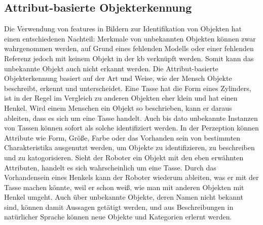 \subsection{Attribut-basierte Objekterkennung}
\label{sec:aboi}

Die Verwendung von \glspl{feature} in Bildern zur Identifikation von Objekten hat einen entschiedenen Nachteil: Merkmale von unbekannten Objekten können zwar wahrgenommen werden, auf Grund eines fehlenden Modells oder einer fehlenden Referenz jedoch mit keinem Objekt in der \gls{kb} verknüpft werden. Somit kann das unbekannte Objekt auch nicht erkannt werden. \newline
Die Attribut-basierte Objekterkennung basiert auf der Art und Weise, wie der Mensch Objekte beschreibt, erkennt und unterscheidet. Eine Tasse hat die Form eines Zylinders, ist in der Regel im Vergleich zu anderen Objekten eher klein und hat einen Henkel. Wird einem Menschen ein Objekt so beschrieben, kann er daraus ableiten, dass es sich um eine Tasse handelt. Auch bis dato unbekannte Instanzen von Tassen können sofort als solche identifiziert werden. In der Perzeption können Attribute wie Form, Größe, Farbe oder das Vorhanden sein von bestimmten Charakteristika ausgenutzt werden, um Objekte zu identifizieren, zu beschreiben und zu katogorisieren. Sieht der Roboter ein Objekt mit den eben erwähnten Attributen, handelt es sich wahrscheinlich um eine Tasse. Durch das Vorhandensein eines Henkels kann der Roboter wiederum ableiten, was er mit der Tasse machen könnte, weil er schon weiß, wie man mit anderen Objekten mit Henkel umgeht. Auch über unbekannte Objekte, deren Namen nicht bekannt sind, können damit Aussagen getätigt werden, und aus Beschreibungen in natürlicher Sprache können neue Objekte und Kategorien erlernt werden. \cite{descObjbyAtr, atrBasedObjIden} \par


